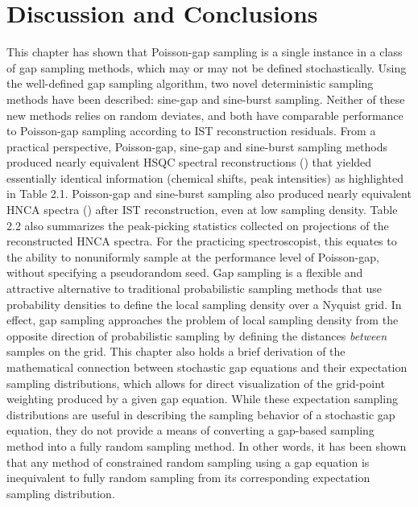 \section{Discussion and Conclusions}

\begin{doublespace}
This chapter has shown that Poisson-gap sampling is a single instance in a
class of gap sampling methods, which may or may not be defined stochastically.
Using the well-defined gap sampling algorithm, two novel deterministic sampling
methods have been described: sine-gap and sine-burst sampling. Neither of
these new methods relies on random deviates, and both have comparable
performance to Poisson-gap sampling according to IST reconstruction residuals.
From a practical perspective, Poisson-gap, sine-gap and sine-burst sampling
methods produced nearly equivalent HSQC spectral reconstructions
() that yielded essentially identical
information (chemical shifts, peak intensities) as highlighted in Table 2.1.
Poisson-gap and sine-burst sampling also produced nearly equivalent HNCA
spectra () after IST reconstruction, even at low
sampling density. Table 2.2 also summarizes the peak-picking statistics
collected on \hnnmr{} projections of the reconstructed HNCA spectra. For the
practicing spectroscopist, this equates to the ability to nonuniformly sample
at the performance level of Poisson-gap, without specifying a pseudorandom
seed. Gap sampling is a flexible and attractive alternative to traditional
probabilistic sampling methods that use probability densities to define the
local sampling density over a Nyquist grid. In effect, gap sampling approaches
the problem of local sampling density from the opposite direction of
probabilistic sampling by defining the distances \emph{between} samples on
the grid. This chapter also holds a brief derivation of the mathematical
connection between stochastic gap equations and their expectation sampling
distributions, which allows for direct visualization of the grid-point
weighting produced by a given gap equation. While these expectation sampling
distributions are useful in describing the sampling behavior of a stochastic
gap equation, they do not provide a means of converting a gap-based sampling
method into a fully random sampling method. In other words, it has been shown
that any method of constrained random sampling using a gap equation is
inequivalent to fully random sampling from its corresponding expectation
sampling distribution.
\\\\

\end{doublespace}
